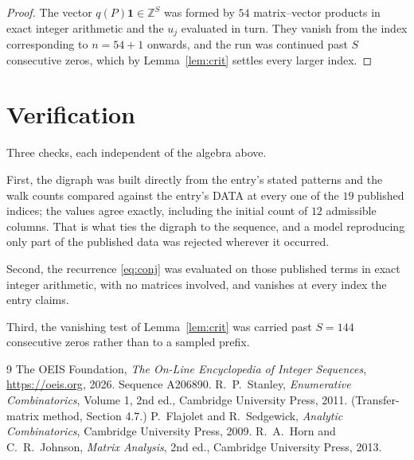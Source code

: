 \documentclass[11pt,a4paper]{article}
\theoremstyle{plain}
\theoremstyle{definition}
\begin{document}
\begin{proof}
The vector $q(P)\mathbf{1}\in\mathbb{Z}^{S}$ was formed by $54$ matrix--vector
products in exact integer arithmetic and the $u_j$ evaluated in turn. They vanish from the
index corresponding to $n=54+1$ onwards, and the run was continued past $S$ consecutive
zeros, which by Lemma~\ref{lem:crit} settles every larger index.
\end{proof}

\section{Verification}

Three checks, each independent of the algebra above.

First, the digraph was built directly from the entry's stated patterns and the walk counts
compared against the entry's DATA at every one of the $19$ published indices; the
values agree exactly, including the initial count of $12$ admissible columns. That is
what ties the digraph to the sequence, and a model reproducing only part of the published
data was rejected wherever it occurred.

Second, the recurrence \eqref{eq:conj} was evaluated on those published terms in exact
integer arithmetic, with no matrices involved, and vanishes at every index the entry claims.

Third, the vanishing test of Lemma~\ref{lem:crit} was carried past $S=144$ consecutive
zeros rather than to a sampled prefix.

\begin{thebibliography}{9}
 The OEIS Foundation, \emph{The On-Line Encyclopedia of Integer
Sequences}, \url{https://oeis.org}, 2026. Sequence A206890.
 R.~P.~Stanley, \emph{Enumerative Combinatorics}, Volume 1, 2nd ed.,
Cambridge University Press, 2011. (Transfer-matrix method, Section 4.7.)
 P.~Flajolet and R.~Sedgewick, \emph{Analytic Combinatorics}, Cambridge
University Press, 2009.
 R.~A.~Horn and C.~R.~Johnson, \emph{Matrix Analysis}, 2nd ed., Cambridge
University Press, 2013.
\end{thebibliography}
\end{document}
